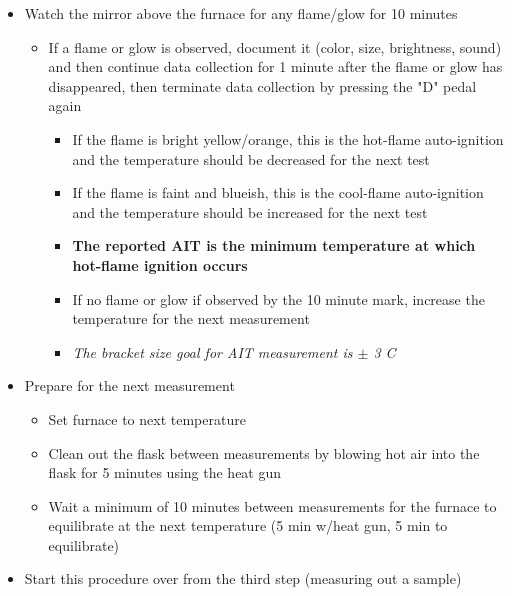 \documentclass[letterpaper,11pt]{article}
\begin{document}
\begin{itemize}
    \item Watch the mirror above the furnace for any flame/glow for 10 minutes
        
        \begin{itemize}
        \item If a flame or glow is observed, document it (color, size, 
            brightness, sound) and then continue data collection for 1 minute
            after the flame or glow has disappeared, then terminate data 
            collection by pressing the "D" pedal again
                
                \begin{itemize}
                \item If the flame is bright yellow/orange, this is the 
                    hot-flame auto-ignition and the temperature should be 
                    decreased for the next test
                \item If the flame is faint and blueish, this is the cool-flame 
                    auto-ignition and the temperature should be increased for 
                    the next test
                \item \textbf{The reported AIT is the minimum temperature at 
                    which hot-flame ignition occurs}
                \item If no flame or glow if observed by the 10 minute mark, 
                    increase the temperature for the next measurement
                \item \textit{The bracket size goal for AIT measurement is $\pm$
                3 \degree C}
                \end{itemize}
        
        \end{itemize}
        
    \item Prepare for the next measurement
        
        \begin{itemize}
        \item Set furnace to next temperature
        \item Clean out the flask between measurements by blowing hot air into 
            the flask for 5 minutes using the heat gun
        \item Wait a minimum of 10 minutes between measurements for the furnace 
            to equilibrate at the next temperature (5 min w/heat gun, 5 min 
            to equilibrate)
        \end{itemize}    
    
    \item Start this procedure over from the third step (measuring out a sample)
    \end{itemize}
\end{document}
